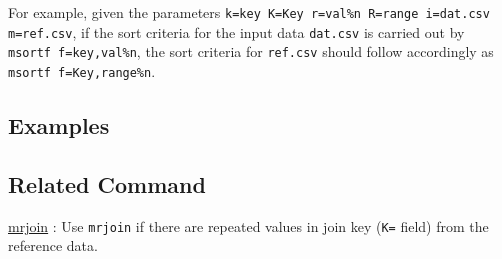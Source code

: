 
For example, given the parameters \verb|k=key K=Key r=val%n R=range i=dat.csv m=ref.csv|, if the sort criteria for the input data \verb|dat.csv| is carried out by \verb|msortf f=key,val%n|, the sort criteria for \verb|ref.csv| should follow accordingly as \verb|msortf f=Key,range%n|. 



\subsection*{Examples}

\subsection*{Related Command}
\hyperref[sect:mrjoin] {mrjoin} : Use \verb|mrjoin| if there are repeated values in join key (\verb|K=| field) from the reference data. 

%

